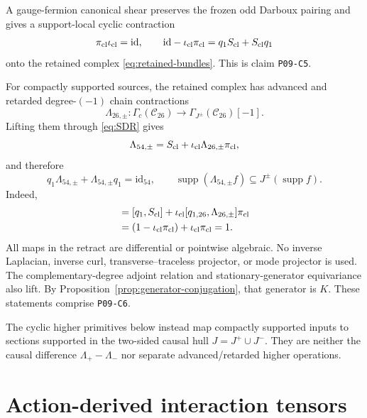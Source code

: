 \documentclass[11pt]{article}
\theoremstyle{definition}
\theoremstyle{remark}
\newcommand{\cC}{\mathcal C}
\newcommand{\id}{\mathrm{id}}
\newcommand{\supp}{\operatorname{supp}}
\newcommand{\claimid}[1]{\texttt{#1}}
\begin{document}
A gauge-fermion canonical shear preserves the frozen odd Darboux pairing and
gives a support-local cyclic contraction
\begin{equation}\label{eq:SDR}
 \pi_{\rm cl}\iota_{\rm cl}=\id,\qquad
 \id-\iota_{\rm cl}\pi_{\rm cl}
 =q_1S_{\rm cl}+S_{\rm cl}q_1
\end{equation}
onto the retained complex \eqref{eq:retained-bundles}.  This is claim
\claimid{P09-C5}.

For compactly supported sources, the retained complex has advanced and
retarded degree-$(-1)$ chain contractions
\begin{equation}
 \Lambda_{26,\pm}:\Gamma_c(\cC_{26})
 \longrightarrow\Gamma_{J^\pm}(\cC_{26})[-1].
\end{equation}
Lifting them through \eqref{eq:SDR} gives
\begin{equation}\label{eq:lambda54}
 \Lambda_{54,\pm}
 =S_{\rm cl}+\iota_{\rm cl}\Lambda_{26,\pm}\pi_{\rm cl},
\end{equation}
and therefore
\begin{equation}\label{eq:causal-contraction}
 q_1\Lambda_{54,\pm}+\Lambda_{54,\pm}q_1=\id_{54},
 \qquad
 \supp(\Lambda_{54,\pm}f)\subseteq J^\pm(\supp f).
\end{equation}
Indeed,
\begin{align}
 [q_1,\Lambda_{54,\pm}]
 &=[q_1,S_{\rm cl}]
 +\iota_{\rm cl}[q_{1,26},\Lambda_{26,\pm}]\pi_{\rm cl}\nonumber\\
 &=(1-\iota_{\rm cl}\pi_{\rm cl})
 +\iota_{\rm cl}\pi_{\rm cl}=1.
\end{align}
All maps in the retract are differential or pointwise algebraic.  No inverse
Laplacian, inverse curl, transverse--traceless projector, or mode projector
is used.  The complementary-degree adjoint relation and stationary-generator
equivariance also lift.  By Proposition~\ref{prop:generator-conjugation}, that
generator is $K$.  These statements comprise \claimid{P09-C6}.

The cyclic higher primitives below instead map compactly supported inputs to
sections supported in the two-sided causal hull $J=J^+\cup J^-$.  They are
neither the causal difference $\Lambda_+-\Lambda_-$ nor separate
advanced/retarded higher operations.

\section{Action-derived interaction tensors}\label{sec:interactions}
\end{document}
